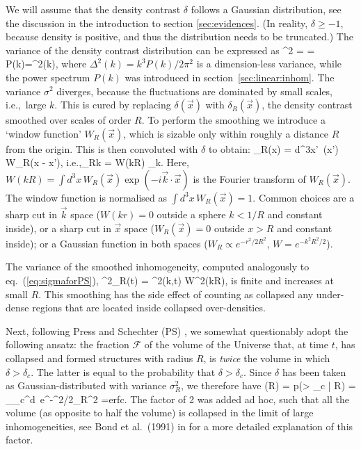 We will assume that the density contrast $\delta$ follows a Gaussian distribution, see the discussion in the introduction to section \ref{sec:evidences}.
(In reality, $\delta\ge -1$, because density is positive, and thus the distribution needs to be truncated.) 
The variance of the density contrast distribution can be expressed as
\beq \sigma^2 = =
\int {}  P(k)=\int{}\Delta^2(k),
\label{eq:sigmaforPS}
\eeq
where  $\Delta^2(k)=k^3 P(k)/2\pi^2$ is a dimension-less variance, while the power spectrum $P(k)$
was introduced in section~\ref{sec:linear:inhom}.
The variance $\sigma^2$ diverges, because the fluctuations are dominated by small scales, i.e.,\ large $k$.
This is cured by replacing $\delta(\vec x)$ with $\delta_R(\vec x)$, 
the density contrast smoothed over scales
of order $R$.
To perform the smoothing we introduce a `window function' $W_R(\vec x)$, which is sizable only within roughly a distance $R$ from the origin. This is then convoluted with $\delta$ to obtain:
\beq \delta_R(\vec x) = \int d^3x'\, \delta(\vec x') W_R(\vec x - \vec x'),
\qquad
\hbox{i.e.,}\qquad \delta_{Rk} = W(kR) \delta_k. 
\eeq
Here, $W(kR) = \int d^3 x \,W_R(\vec x)\exp(-i \vec k\cdot\vec x)$ is the Fourier transform of $W_R(\vec x)$.
The window function is normalised as $\int d^3x\, W_R(\vec x) = 1$.
Common choices are 
a sharp cut in $\vec k$ space ($W(kr) = 0$ outside a sphere $k<1/R$ and constant inside), or
a sharp cut in $\vec x$ space ($W_R(\vec x) = 0$ outside  $x>R$ and constant inside);
or a Gaussian function in both spaces ($W_R\propto e^{-r^2/2R^2}$, $W=e^{-k^2 R^2/2}$).

The variance of the smoothed inhomogeneity, computed analogously to eq.~(\ref{eq:sigmaforPS}), 
\beq 
\sigma^2_R(t) = \int{}\Delta^2(k,t) W^2(kR),
\eeq
is finite and increases at small $R$. 
This smoothing has the side effect of counting as collapsed any under-dense regions that are located inside collapsed over-densities.

Next, following Press and Schechter (PS) \cite{HaloMassFunction}, we somewhat questionably adopt the following ansatz: the fraction $\mathcal{F}$ of the 
volume of the Universe that, at time $t$, has collapsed and formed structures with radius $R$, 
is {\em twice} the volume in which $\delta > \delta_c$. The latter is equal to the probability that $\delta > \delta_c$. Since $\delta$ has been taken as Gaussian-distributed with variance $\sigma^2_R$, we therefore have 
\beq {}(R) = p(\delta > \delta_c | R) =  \int_{\delta_c}^\infty d\delta\, e^{-\delta^2/2\sigma_R^2}
={\rm erfc}.
\label{eq:pcollapse}
\eeq
The factor of 2 was added ad hoc, 
such that all the volume (as opposite to half the volume) is collapsed in the limit of large inhomogeneities, see Bond et al.~(1991) in \cite{HaloMassFunction} for a more detailed explanation of this factor.

